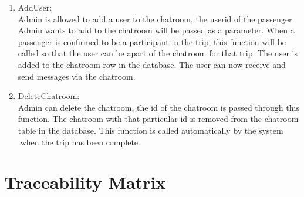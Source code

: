 \documentclass[hidelinks, 12pt, a4paper]{article}
\begin{document}
\begin{enumerate}[label=U1.\arabic*]
      \item AddUser:\\
            Admin is allowed to add a user to the chatroom, the userid of the passenger Admin wants to add to the chatroom will be passed as a parameter. When a passenger is confirmed to be a participant in the trip, this function will be called so that the user can be apart of the chatroom for that trip. The user is added to the chatroom row in the database. The user can now receive and send messages via the chatroom.\\

      \item DeleteChatroom:\\
            Admin can delete the chatroom, the id of the chatroom is passed through this function. The chatroom with that particular id is removed from the chatroom table in the database. This function is called automatically by the system .when the trip has been complete.\\
\end{enumerate}
\newpage
\section{Traceability Matrix}
\end{document}
